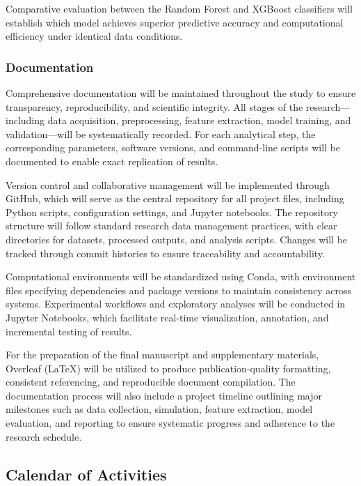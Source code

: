 Comparative evaluation between the Random Forest and XGBoost classifiers will establish which model achieves superior predictive accuracy and computational efficiency under identical data conditions.

\subsubsection{Documentation}

Comprehensive documentation will be maintained throughout the study to ensure transparency, reproducibility, and scientific integrity. All stages of the research—including data acquisition, preprocessing, feature extraction, model training, and validation—will be systematically recorded. For each analytical step, the corresponding parameters, software versions, and command-line scripts will be documented to enable exact replication of results.

Version control and collaborative management will be implemented through GitHub, which will serve as the central repository for all project files, including Python scripts, configuration settings, and Jupyter notebooks. The repository structure will follow standard research data management practices, with clear directories for datasets, processed outputs, and analysis scripts. Changes will be tracked through commit histories to ensure traceability and accountability.

Computational environments will be standardized using Conda, with environment files specifying dependencies and package versions to maintain consistency across systems. Experimental workflows and exploratory analyses will be conducted in Jupyter Notebooks, which facilitate real-time visualization, annotation, and incremental testing of results.

For the preparation of the final manuscript and supplementary materials, Overleaf (LaTeX) will be utilized to produce publication-quality formatting, consistent referencing, and reproducible document compilation. The documentation process will also include a project timeline outlining major milestones such as data collection, simulation, feature extraction, model evaluation, and reporting to ensure systematic progress and adherence to the research schedule.

\subsection{Calendar of Activities}

